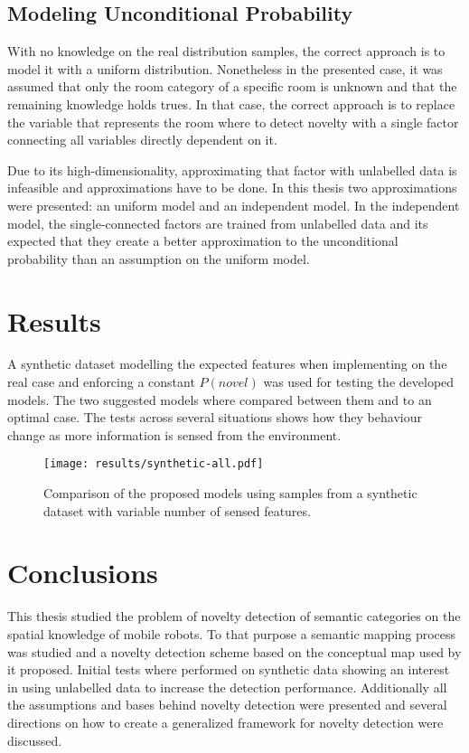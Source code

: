 \documentclass[9pt,a4paper]{extarticle}
\begin{document}
\begin{multicols}{2}
\subsection{Modeling Unconditional Probability}
With no knowledge on the real distribution samples, the correct approach is to model it
with a uniform distribution. Nonetheless in the presented case, it was assumed that only the room
category of a specific room is unknown and that the remaining knowledge holds trues.
In that case, the correct approach is to replace the variable that represents the room where to
detect novelty with a single factor connecting all variables directly dependent on it. 

Due to its high-dimensionality, approximating that factor with unlabelled data is infeasible and
approximations have to be done. In this thesis two approximations were presented: an uniform model
and an independent model. In the independent model, the
single\hyp{}connected factors are trained from unlabelled data and its expected that they create a better
approximation to the unconditional probability than an assumption on the uniform model.

\section{Results}
A synthetic dataset modelling the expected features when implementing on the real case and enforcing
a constant $P(novel)$ was used for testing the developed models.
The two suggested models where compared between them and to an optimal case.
The tests across several situations shows how they behaviour change as more information is sensed
from the environment.

\begin{figure}[H]
\centering
\texttt{[image: results/synthetic-all.pdf]}
\caption{\label{fig:results}Comparison of the proposed models using samples from a synthetic dataset
         with variable number of sensed features.}
\end{figure}

\section{Conclusions}
This thesis studied the problem of novelty detection of semantic categories on the spatial knowledge
of mobile robots. To that purpose a semantic mapping process~\cite{pronobis2011semmap} was studied and
a novelty detection scheme based on the conceptual map used by it proposed.
Initial tests where performed on synthetic data showing an interest in using unlabelled data to
increase the detection performance.
Additionally all the assumptions and bases behind novelty detection were presented and several
directions on how to create a generalized framework for novelty detection were discussed.





\end{multicols}
\end{document}
